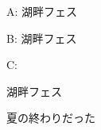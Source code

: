 \documentclass{article}
\begin{document}
A: {\japanesefont 湖畔フェス}

B: \textjapanese{湖畔フェス}

C:
\begin{japanese}
湖畔フェス

夏の終わりだった
\end{japanese}
\end{document}
